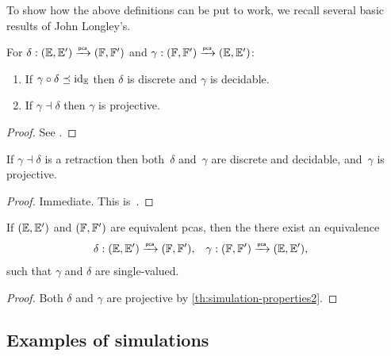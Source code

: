 To show how the above definitions can be put to work, we recall several basic results of John Longley's.

\begin{theorem}
  \label{th:simulation-properties2}%
  For $\delta: (\EE, \subEE) \pcato (\FF, \subFF)$ and
  $\gamma: (\FF, \subFF) \pcato (\EE, \subEE)$:
  \begin{enumerate}
  \item
    If $\gamma \circ \delta \preceq \id[\EE]$ then $\delta$ is discrete 
    and $\gamma$ is decidable.
  \item
    If $\gamma \dashv \delta$ then $\gamma$ is projective.
  \end{enumerate}
\end{theorem}

\begin{proof}
  See \cite[Theorem 2.5.3]{Longley:94}.
\end{proof}

\begin{corollary}
  \label{th:simulation-properties}%
  If $\gamma \dashv \delta$ is a retraction then both~$\delta$
  and~$\gamma$ are discrete and decidable, and~$\gamma$ is projective.
\end{corollary}

\begin{proof}
  Immediate. This is~\cite[Corollary 2.5.4]{Longley:94}.
\end{proof}

\begin{corollary}
  \label{th:simulation-properties-more}%
  If $(\EE, \subEE)$ and $(\FF, \subFF)$ are equivalent pcas, then the 
  there exist an equivalence
  \begin{align*}
    \delta &: (\EE, \subEE) \pcato (\FF, \subFF),
    &
    \gamma &: (\FF, \subFF) \pcato (\EE, \subEE),
  \end{align*}
  such that $\gamma$ and $\delta$ are single-valued.
\end{corollary}

\begin{proof}
  Both $\delta$ and $\gamma$ are projective by
  \cref{th:simulation-properties2}.
\end{proof}

\subsection{Examples of simulations}
\label{sec:examples-simulations}

